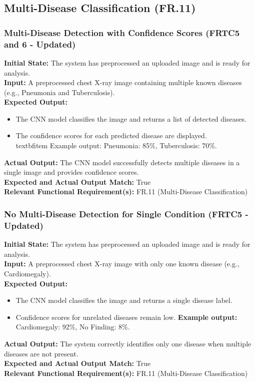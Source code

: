 \documentclass[12pt, titlepage]{article}
\begin{document}
\subsection{Multi-Disease Classification (FR.11)}
\subsubsection{Multi-Disease Detection with Confidence Scores (FRTC5 and 6 - Updated)}
\textbf{Initial State:} The system has preprocessed an uploaded image and is ready for analysis.\\
\textbf{Input:} A preprocessed chest X-ray image containing multiple known diseases (e.g., Pneumonia and Tuberculosis).\\
\textbf{Expected Output:}
\begin{itemize}
\item The CNN model classifies the image and returns a list of detected diseases.
\item The confidence scores for each predicted disease are displayed.
\\textbf{item Example output:} Pneumonia: 85\%, Tuberculosis: 70\%.
\end{itemize}
\textbf{Actual Output:} The CNN model successfully detects multiple diseases in a single image and provides confidence scores.\\
\textbf{Expected and Actual Output Match:} True\\
\textbf{Relevant Functional Requirement(s):} FR.11 (Multi-Disease Classification)\\

\subsubsection{No Multi-Disease Detection for Single Condition (FRTC5 - Updated)}
\textbf{Initial State:} The system has preprocessed an uploaded image and is ready for analysis.\\
\textbf{Input:} A preprocessed chest X-ray image with only one known disease (e.g., Cardiomegaly).\\
\textbf{Expected Output:}
\begin{itemize}
\item The CNN model classifies the image and returns a single disease label.
\item Confidence scores for unrelated diseases remain low.
\textbf{Example output:} Cardiomegaly: 92\%, No Finding: 8\%.
\end{itemize}
\textbf{Actual Output:} The system correctly identifies only one disease when multiple diseases are not present.\\
\textbf{Expected and Actual Output Match:} True\\
\textbf{Relevant Functional Requirement(s):} FR.11 (Multi-Disease Classification)\\
\end{document}
